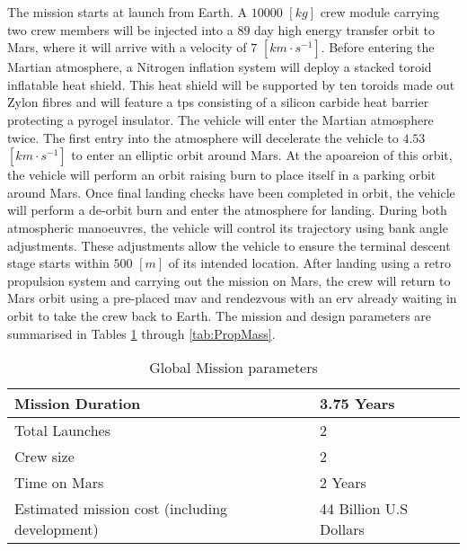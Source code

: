 The mission starts at launch from Earth. A $10 000$ $[kg]$ crew module carrying two crew members will be injected into a $89$ day high energy transfer orbit to Mars, where it will arrive with a velocity of $7$ $[km\cdot s^{-1}]$. Before entering the Martian atmosphere, a Nitrogen inflation system will deploy a stacked toroid inflatable heat shield. This heat shield will be supported by ten toroids made out Zylon fibres and will feature a \gls{tps} consisting of a silicon carbide heat barrier protecting a pyrogel insulator. The vehicle will enter the Martian atmosphere twice. The first entry into the atmosphere will decelerate the vehicle to $4.53$ $[km\cdot s^{-1}]$ to enter an elliptic orbit around Mars. At the apoareion of this orbit, the vehicle will perform an orbit raising burn to place itself in a parking orbit around Mars. Once final landing checks have been completed in orbit, the vehicle will perform a de-orbit burn and enter the atmosphere for landing. During both atmospheric manoeuvres, the vehicle will control its trajectory using bank angle adjustments. These adjustments allow the vehicle to ensure the terminal descent stage starts within $500$ $[m]$ of its intended location. After landing using a retro propulsion system and carrying out the mission on Mars, the crew will return to Mars orbit using a pre-placed \gls{mav} and rendezvous with an \gls{erv} already waiting in orbit to take the crew back to Earth. The mission and design parameters are summarised in Tables \ref{tab:MissionPar} through \ref{tab:PropMass}.


\begin{table}[H]
	\centering
	\caption{Global Mission parameters}
	\label{tab:MissionPar}
	\begin{tabular}{|p{}|p{}|} \hline
		Mission Duration				             	& 	3.75 Years						\\ \hline 
		Total Launches       							&	2  		   	  					\\ \hline
		Crew size				 						&	2     	  						\\ \hline
		Time on Mars				              	   	&  	2 Years    						\\ \hline
		Estimated mission cost (including development) 	&  	44 Billion U.S Dollars			\\ \hline
	\end{tabular}
\end{table}


